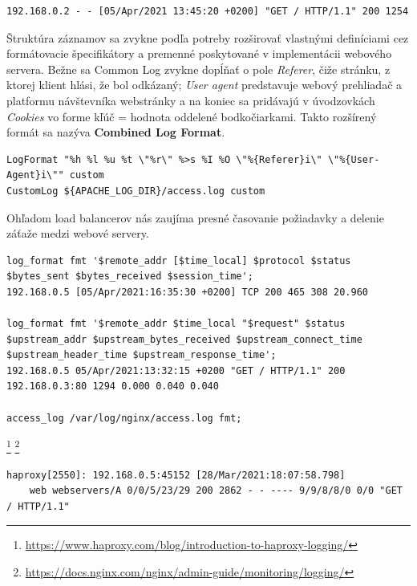 \documentclass[12pt, a4paper]{article}
\begin{document}
\begin{lstlisting}[caption=Ukážka záznamu v Common Log Format]
192.168.0.2 - - [05/Apr/2021 13:45:20 +0200] "GET / HTTP/1.1" 200 1254
\end{lstlisting}

Štruktúra záznamov sa zvykne podľa potreby rozširovať vlastnými definíciami cez formátovacie špecifikátory
a premenné poskytované v implementácii webového servera. Bežne sa Common Log zvykne dopĺňať o pole 
\emph{Referer}, čiže stránku, z ktorej klient hlási, že bol odkázaný; \emph{User agent} predstavuje webový 
prehliadač a platformu návštevníka webstránky a na koniec sa pridávajú v úvodzovkách \emph{Cookies} vo forme 
kľúč = hodnota oddelené bodkočiarkami. Takto rozšírený formát sa nazýva \textbf{Combined Log Format}.

\begin{lstlisting}[caption=Vlastný formát pre access log na webovom serveri Apache, basicstyle=\ttfamily\scriptsize]
LogFormat "%h %l %u %t \"%r\" %>s %I %O \"%{Referer}i\" \"%{User-Agent}i\"" custom
CustomLog ${APACHE_LOG_DIR}/access.log custom
\end{lstlisting}

Ohľadom load balancerov nás zaujíma presné časovanie požiadavky a delenie záťaže medzi webové servery. 


\begin{lstlisting}[caption=NGINX vlastný TCP a HTTP Log, basicstyle=\ttfamily\scriptsize]
log_format fmt '$remote_addr [$time_local] $protocol $status $bytes_sent $bytes_received $session_time';
192.168.0.5 [05/Apr/2021:16:35:30 +0200] TCP 200 465 308 20.960 

log_format fmt '$remote_addr $time_local "$request" $status $upstream_addr $upstream_bytes_received $upstream_connect_time $upstream_header_time $upstream_response_time';
192.168.0.5 05/Apr/2021:13:32:15 +0200 "GET / HTTP/1.1" 200 192.168.0.3:80 1294 0.000 0.040 0.040

access_log /var/log/nginx/access.log fmt;
\end{lstlisting}

\footnote{\url{https://www.haproxy.com/blog/introduction-to-haproxy-logging/}}
\footnote{\url{https://docs.nginx.com/nginx/admin-guide/monitoring/logging/}}

\begin{lstlisting}[caption=HAProxy log]
haproxy[2550]: 192.168.0.5:45152 [28/Mar/2021:18:07:58.798] 
    web webservers/A 0/0/5/23/29 200 2862 - - ---- 9/9/8/8/0 0/0 "GET / HTTP/1.1"
\end{lstlisting}
\end{document}
